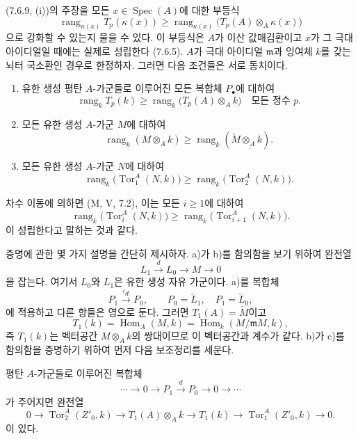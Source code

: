 \begin{remark}[7.6.11]
\label{III.7.6.11-fr}
(7.6.9, (i))의 주장을 모든 $x\in\operatorname{Spec}(A)$에 대한 부등식
\[
  \operatorname{rang}_{\kappa(x)}T_p(\kappa(x))
  \geq
  \operatorname{rang}_{\kappa(x)}
    \bigl(T_p(A)\otimes_A\kappa(x)\bigr)
  \tag{7.6.11.1}\label{III.7.6.11.1.fr}
\]
으로 강화할 수 있는지 물을 수 있다. 이 부등식은 $A$가 이산
값매김환이고 $x$가 그 극대 아이디얼일 때에는 실제로 성립한다 (7.6.5).
$A$가 극대 아이디얼 $\mathfrak m$과 잉여체 $k$를 갖는 뇌터 국소환인
경우로 한정하자. 그러면 다음 조건들은 서로 동치이다.
\begin{enumerate}
  \item[a)] 유한 생성 평탄 $A$-가군들로 이루어진 모든 복합체
    $P_\bullet$에 대하여
    \[
      \operatorname{rang}_k T_p(k)
      \geq
      \operatorname{rang}_k\bigl(T_p(A)\otimes_A k\bigr)
      \quad\text{모든 정수 }p.
      \tag{7.6.11.2}\label{III.7.6.11.2.fr}
    \]
  \item[b)] 모든 유한 생성 $A$-가군 $M$에 대하여
    \[
      \operatorname{rang}_k(M\otimes_A k)
      \geq
      \operatorname{rang}_k(\check M\otimes_A k).
      \tag{7.6.11.3}\label{III.7.6.11.3.fr}
    \]
  \item[c)] 모든 유한 생성 $A$-가군 $N$에 대하여
    \[
      \operatorname{rang}_k\bigl(\operatorname{Tor}_1^A(N,k)\bigr)
      \geq
      \operatorname{rang}_k\bigl(\operatorname{Tor}_2^A(N,k)\bigr).
      \tag{7.6.11.4}\label{III.7.6.11.4.fr}
    \]
\end{enumerate}
차수 이동에 의하면 (M, V, 7.2), 이는 모든 $i\geq1$에 대하여
\[
  \operatorname{rang}_k\bigl(\operatorname{Tor}_i^A(N,k)\bigr)
  \geq
  \operatorname{rang}_k\bigl(\operatorname{Tor}_{i+1}^A(N,k)\bigr).
  \tag{7.6.11.5}\label{III.7.6.11.5.fr}
\]
이 성립한다고 말하는 것과 같다.

증명에 관한 몇 가지 설명을 간단히 제시하자. a)가 b)를 함의함을 보기
위하여 완전열
\[
  L_1\xrightarrow{d}L_0\longrightarrow M\longrightarrow0
\]
을 잡는다. 여기서 $L_0$와 $L_1$은 유한 생성 자유 가군이다. a)를
복합체
\[
  P_1\xrightarrow{{}^t d}P_0,
  \qquad
  P_0=\check L_1,
  \quad
  P_1=\check L_0,
\]
에 적용하고 다른 항들은 영으로 둔다. 그러면 $T_1(A)=\check M$이고
\[
  T_1(k)
  =
  \operatorname{Hom}_A(M,k)
  =
  \operatorname{Hom}_k(M/\mathfrak mM,k),
\]
즉 $T_1(k)$는 벡터공간 $M\otimes_A k$의 쌍대이므로 이 벡터공간과
계수가 같다. b)가 c)를 함의함을 증명하기 위하여 먼저 다음 보조정리를
세운다.

\begin{lemma}[7.6.11.6]
\label{III.7.6.11.6-fr}
평탄 $A$-가군들로 이루어진 복합체
\[
  \cdots\longrightarrow0\longrightarrow
  P_1\xrightarrow{d}P_0
  \longrightarrow0\longrightarrow\cdots
\]
가 주어지면 완전열
\[
  0\longrightarrow\operatorname{Tor}_2^A(Z'_0,k)
  \longrightarrow T_1(A)\otimes_A k
  \longrightarrow T_1(k)
  \longrightarrow\operatorname{Tor}_1^A(Z'_0,k)
  \longrightarrow0.
  \tag{7.6.11.7}\label{III.7.6.11.7.fr}
\]
이 있다.
\end{lemma}


\end{remark}
